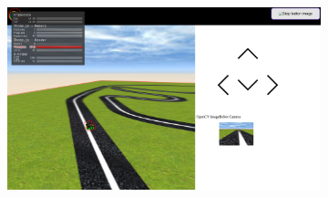\begin{figure}[H]
\centering
\begin{subfigure}[b]{0.475\textwidth}
\centering
    \includegraphics[width=\textwidth]{img/pibot_teleoperator.png}
\label{fig:pibottele}
\end{subfigure}
\hfill
\begin{subfigure}[b]{0.475\textwidth}\centering


\end{subfigure}
\end{figure}
